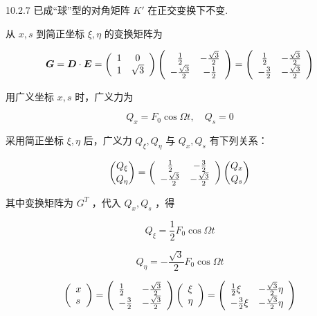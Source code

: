 \begin{problem}{10.2.7}
已成“球”型的对角矩阵 $K'$ 在正交变换下不变.

从 $x, s$ 到简正坐标 $\xi, \eta$ 的变换矩阵为

\[
\boldsymbol {G} = \boldsymbol {D} \cdot \boldsymbol {E} = \left( \begin{array}{c c} 1 & 0 \\ 1 & \sqrt {3} \end{array} \right) \left( \begin{array}{c c} \frac {1}{2} & - \frac {\sqrt {3}}{2} \\ - \frac {\sqrt {3}}{2} & - \frac {1}{2} \end{array} \right) = \left( \begin{array}{c c} \frac {1}{2} & - \frac {\sqrt {3}}{2} \\ - \frac {3}{2} & - \frac {\sqrt {3}}{2} \end{array} \right)
\]

用广义坐标 $x, s$ 时，广义力为

\[
Q _ {x} = F _ {0} \cos \Omega t, \quad Q _ {s} = 0
\]

采用简正坐标 $\xi, \eta$ 后，广义力 $Q_{\xi}, Q_{\eta}$ 与 $Q_{x}, Q_{s}$ 有下列关系：

\[
\binom {Q _ {\xi}} {Q _ {\eta}} = \left( \begin{array}{c c} \frac {1}{2} & - \frac {3}{2} \\ - \frac {\sqrt {3}}{2} & - \frac {\sqrt {3}}{2} \end{array} \right) \binom {Q _ {x}} {Q _ {s}}
\]

其中变换矩阵为 $G^{T}$ ，代入 $Q_{x}, Q_{s}$ ，得

\[
Q _ {\xi} = \frac {1}{2} F _ {0} \cos \Omega t
\]

\[
Q _ {\eta} = - \frac {\sqrt {3}}{2} F _ {0} \cos \Omega t
\]

\[
\left( \begin{array}{l} x \\ s \end{array} \right) = \left( \begin{array}{l l} \frac {1}{2} & - \frac {\sqrt {3}}{2} \\ - \frac {3}{2} & - \frac {\sqrt {3}}{2} \end{array} \right) \left( \begin{array}{l} \xi \\ \eta \end{array} \right) = \left( \begin{array}{l l} \frac {1}{2} \xi & - \frac {\sqrt {3}}{2} \eta \\ - \frac {3}{2} \xi & - \frac {\sqrt {3}}{2} \eta \end{array} \right)
\]


\end{problem}
